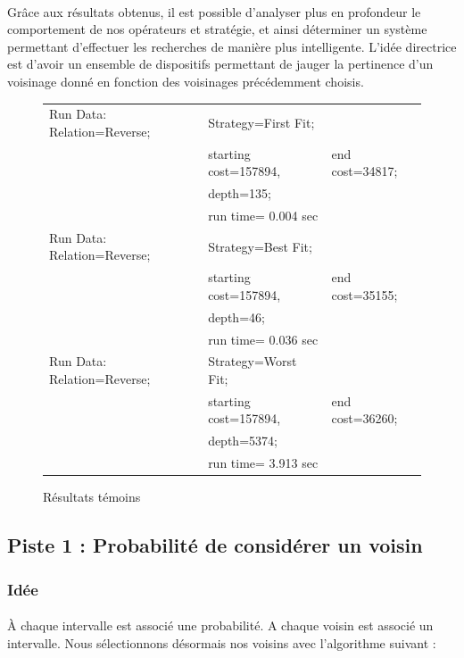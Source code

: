 \documentclass[a4paper,10pt]{report}
\begin{document}
\paragraph{}
  Grâce aux résultats obtenus, il est possible d'analyser plus en profondeur le
comportement de nos opérateurs et stratégie, et ainsi déterminer un système
permettant d'effectuer les recherches de manière plus intelligente. L'idée
directrice est d'avoir un ensemble de dispositifs permettant de jauger la
pertinence d'un voisinage donné en fonction des voisinages précédemment choisis.

\begin{figure}[h]
  \begin{tabular}{lll}
    Run Data: Relation=Reverse;&
      Strategy=First Fit;\\
      &starting cost=157894,&
      end cost=34817;\\
      &depth=135;\\
      &run time= 0.004 sec\\
    Run Data: Relation=Reverse;&
      Strategy=Best Fit;\\
      &starting cost=157894,&
      end cost=35155;\\
      &depth=46;\\
      &run time= 0.036 sec\\
    Run Data: Relation=Reverse;&
      Strategy=Worst Fit;\\
      &starting cost=157894,&
      end cost=36260;\\
      &depth=5374;\\
      &run time= 3.913 sec\\
  \end{tabular}
  \caption{Résultats témoins}
\end{figure}


\subsection{Piste 1 : Probabilité de considérer un voisin}
\subsubsection{Idée}

\paragraph{}
À chaque intervalle est associé une probabilité. A chaque voisin est associé un
intervalle. Nous sélectionnons désormais nos voisins avec l'algorithme suivant :
\end{document}
